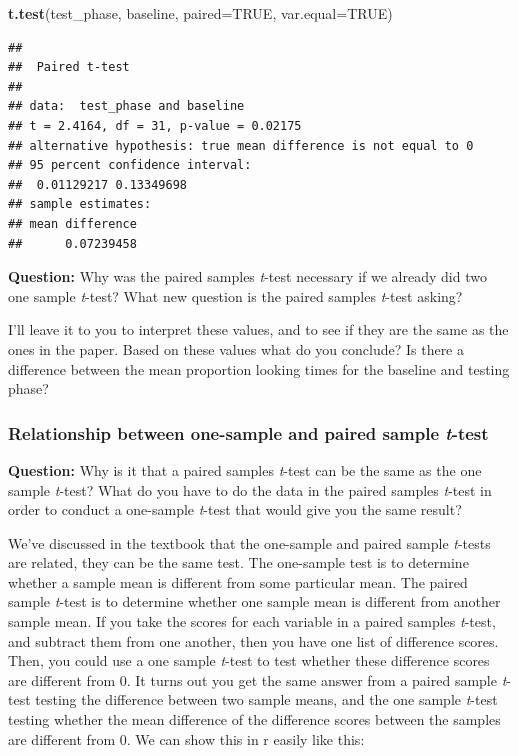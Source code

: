 \documentclass[
]{book}
\newenvironment{Shaded}{\begin{snugshade}}{\end{snugshade}}
\newcommand{\AttributeTok}[1]{\textcolor[rgb]{0.13,0.29,0.53}{#1}}
\newcommand{\ConstantTok}[1]{\textcolor[rgb]{0.56,0.35,0.01}{#1}}
\newcommand{\FunctionTok}[1]{\textcolor[rgb]{0.13,0.29,0.53}{\textbf{#1}}}
\newcommand{\NormalTok}[1]{#1}
\begin{document}
\begin{Shaded}
\begin{Highlighting}[]
\FunctionTok{t.test}\NormalTok{(test\_phase, baseline, }\AttributeTok{paired=}\ConstantTok{TRUE}\NormalTok{, }\AttributeTok{var.equal=}\ConstantTok{TRUE}\NormalTok{)}
\end{Highlighting}
\end{Shaded}

\begin{verbatim}
## 
##  Paired t-test
## 
## data:  test_phase and baseline
## t = 2.4164, df = 31, p-value = 0.02175
## alternative hypothesis: true mean difference is not equal to 0
## 95 percent confidence interval:
##  0.01129217 0.13349698
## sample estimates:
## mean difference 
##      0.07239458
\end{verbatim}

\textbf{Question:} Why was the paired samples \emph{t}-test necessary if we already did two one sample \emph{t}-test? What new question is the paired samples \emph{t}-test asking?

I'll leave it to you to interpret these values, and to see if they are the same as the ones in the paper. Based on these values what do you conclude? Is there a difference between the mean proportion looking times for the baseline and testing phase?

\hypertarget{relationship-between-one-sample-and-paired-sample-t-test}{%
\subsubsection{\texorpdfstring{Relationship between one-sample and paired sample \emph{t}-test}{Relationship between one-sample and paired sample t-test}}\label{relationship-between-one-sample-and-paired-sample-t-test}}

\textbf{Question:} Why is it that a paired samples \emph{t}-test can be the same as the one sample \emph{t}-test? What do you have to do the data in the paired samples \emph{t}-test in order to conduct a one-sample \emph{t}-test that would give you the same result?

We've discussed in the textbook that the one-sample and paired sample \emph{t}-tests are related, they can be the same test. The one-sample test is to determine whether a sample mean is different from some particular mean. The paired sample \emph{t}-test is to determine whether one sample mean is different from another sample mean. If you take the scores for each variable in a paired samples \emph{t}-test, and subtract them from one another, then you have one list of difference scores. Then, you could use a one sample \emph{t}-test to test whether these difference scores are different from 0. It turns out you get the same answer from a paired sample \emph{t}-test testing the difference between two sample means, and the one sample \emph{t}-test testing whether the mean difference of the difference scores between the samples are different from 0. We can show this in r easily like this:
\end{document}
